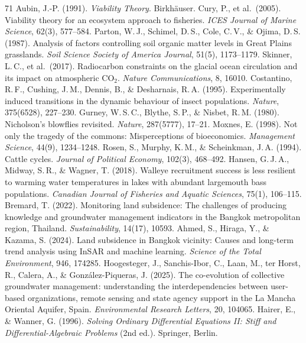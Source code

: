 \documentclass[twocolumn,10pt]{article}
\begin{document}
\begin{thebibliography}{71}
 Aubin, J.-P. (1991). \textit{Viability Theory}. Birkh\"auser.
 Cury, P., et al.\ (2005). Viability theory for an ecosystem approach to fisheries. \textit{ICES Journal of Marine Science}, 62(3), 577--584.
 Parton, W.\,J., Schimel, D.\,S., Cole, C.\,V., \& Ojima, D.\,S. (1987). Analysis of factors controlling soil organic matter levels in Great Plains grasslands. \textit{Soil Science Society of America Journal}, 51(5), 1173--1179.
 Skinner, L.\,C., et al.\ (2017). Radiocarbon constraints on the glacial ocean circulation and its impact on atmospheric CO\(_2\). \textit{Nature Communications}, 8, 16010.
 Costantino, R.\,F., Cushing, J.\,M., Dennis, B., \& Desharnais, R.\,A. (1995). Experimentally induced transitions in the dynamic behaviour of insect populations. \textit{Nature}, 375(6528), 227--230.
 Gurney, W.\,S.\,C., Blythe, S.\,P., \& Nisbet, R.\,M. (1980). Nicholson's blowflies revisited. \textit{Nature}, 287(5777), 17--21.
 Moxnes, E. (1998). Not only the tragedy of the commons: Misperceptions of bioeconomics. \textit{Management Science}, 44(9), 1234--1248.
 Rosen, S., Murphy, K.\,M., \& Scheinkman, J.\,A. (1994). Cattle cycles. \textit{Journal of Political Economy}, 102(3), 468--492.
 Hansen, G.\,J.\,A., Midway, S.\,R., \& Wagner, T. (2018). Walleye recruitment success is less resilient to warming water temperatures in lakes with abundant largemouth bass populations. \textit{Canadian Journal of Fisheries and Aquatic Sciences}, 75(1), 106--115.
 Bremard, T. (2022). Monitoring land subsidence: The challenges of producing knowledge and groundwater management indicators in the Bangkok metropolitan region, Thailand. \textit{Sustainability}, 14(17), 10593.
 Ahmed, S., Hiraga, Y., \& Kazama, S. (2024). Land subsidence in Bangkok vicinity: Causes and long-term trend analysis using InSAR and machine learning. \textit{Science of the Total Environment}, 946, 174285.
 Hoogesteger, J., Sanchis-Ibor, C., Laan, M., ter Horst, R., Calera, A., \& Gonz\'alez-Piqueras, J. (2025). The co-evolution of collective groundwater management: understanding the interdependencies between user-based organizations, remote sensing and state agency support in the La Mancha Oriental Aquifer, Spain. \textit{Environmental Research Letters}, 20, 104065.
 Hairer, E., \& Wanner, G. (1996). \textit{Solving Ordinary Differential Equations II: Stiff and Differential-Algebraic Problems} (2nd ed.). Springer, Berlin.

\end{thebibliography}
\end{document}
